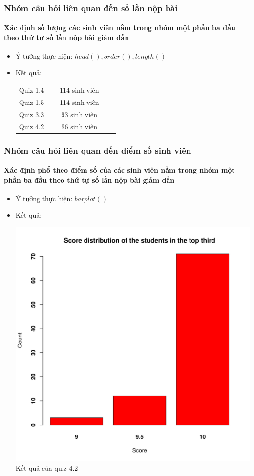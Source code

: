 \documentclass[english,10pt,table]{beamer}
\begin{document}
\frame
{
\frametitle{Nhóm câu hỏi liên quan đến số lần nộp bài}
\framesubtitle{Xác định số lượng các sinh viên nằm trong nhóm một phần ba đầu theo thứ tự số lần nộp bài giảm dần}
\begin{itemize}
    \item Ý tưởng thực hiện: $head(), order(), length()$
    \item Kết quả:\\
    \begin{center}
        \begin{tabular}{l l c c c}
             Quiz 1.4 & $\;$ & 114 sinh viên\\
             Quiz 1.5 & $\;$ & 114 sinh viên\\
             Quiz 3.3 & $\;$ & 93 sinh viên\\
             Quiz 4.2 & $\;$ & 86 sinh viên
        \end{tabular}
    \end{center}
\end{itemize}
}

\frame
{
\frametitle{Nhóm câu hỏi liên quan đến điểm số sinh viên}
\framesubtitle{Xác định phổ theo điểm số của các sinh viên nằm trong nhóm một phần ba đầu theo thứ tự số lần nộp bài giảm dần}
\begin{itemize}
    \item Ý tưởng thực hiện: $barplot()$
    \item Kết quả:\\
    \begin{center}
        \includegraphics[width = 6 cm]{Images/img3-5-4.png}\\
        Kết quả của quiz 4.2
    \end{center}
\end{itemize}
}
\end{document}
